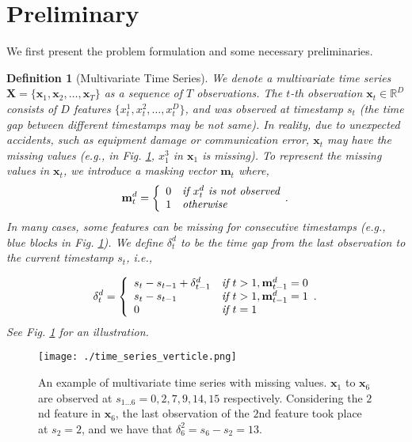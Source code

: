 \documentclass{article}
\newtheorem{definition}{Definition}
\newcommand{\x}{{\mathbf x}}
\newcommand{\m}{{\mathbf m}}
\newcommand{\X}{{\mathbf X}}
\begin{document}
%
 \section{Preliminary}

We first present the problem formulation and some necessary preliminaries.

\begin{definition}[Multivariate Time Series] We denote a multivariate time series $\X = \{\x_1, \x_2, \ldots, \x_T\}$ as a sequence of $T$ observations. The $t$-th observation $\x_t \in \mathbb{R}^D$ consists of $D$ features $\{x_t^1, x_t^2, \ldots, x_t^D\}$, and was observed at timestamp $s_t$  (the time gap between different timestamps may  be not same).  In reality, due to unexpected accidents, such as equipment damage or communication error, $\x_t$ may have the missing values (e.g., in Fig. \ref{fig:time_series}, $x_1^3$ in $\x_1$ is missing). To represent the missing values in $\x_t$, we introduce a {\em masking vector} $\m_t$ where, 
\begin{eqnarray*}
\m_t^d = \left\{
\begin{array}{ll}
0 & \text{{\em if }} x_t^d \text{\em{ is not observed}}\\
1 & \text{{\em otherwise}}
\end{array}.
\right.
\end{eqnarray*}
In many cases, some features can be missing for consecutive timestamps (e.g., blue blocks in Fig. \ref{fig:time_series}). We define $\delta_t^d$ to be the time gap from the last observation to the current timestamp $s_t$, i.e., 

\begin{eqnarray*}
\delta_t^d = \left\{
\begin{array}{ll}
s_t - s_{t - 1} + \delta_{t - 1}^d & \text{{\em if }} t > 1, \m_{t - 1}^d = 0\\
s_t - s_{t - 1} & \text{{\em if }} t > 1, \m_{t - 1}^d = 1 \\
0 & \text{{\em if }} t = 1
\end{array}.
\right.
\end{eqnarray*}
See Fig. \ref{fig:time_series} for an illustration.
\end{definition}


\begin{figure}[ht]
\centering
\texttt{[image: ./time\_series\_verticle.png]}
\caption{An example of multivariate time series with missing values. $\x_1$ to $\x_6$ are observed at $s_{1 \ldots 6} = 0, 2, 7, 9, 14, 15$ respectively. Considering the $2$nd feature in $\x_6$, the last observation of the $2$nd feature took place at $s_2 = 2$, and we have that $\delta_6^2 = s_6 - s_2 = 13$.}
\label{fig:time_series}
\end{figure}
\end{document}
